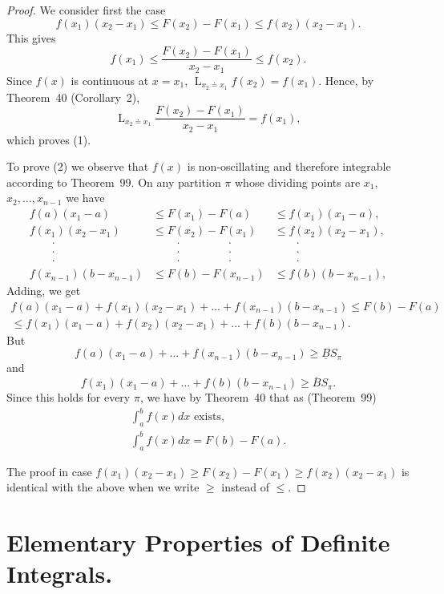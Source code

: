 \documentclass[a4paper,12pt]{book}[2004/02/16]
\providecommand{\leqq}{\leq}
\providecommand{\geqq}{\geq}
\providecommand{\hyperlink}[2]{#2}
\providecommand{\hypertarget}[2]{#2}
\theoremstyle{ilemma}
\theoremstyle{itheorem}
\theoremstyle{iother}
\theoremstyle{icorollary}
\theoremstyle{numcorollary}
\theoremstyle{idefinition}
\begin{document}
\begin{proof}
We consider first the case
\[
  f(x_1)(x_2-x_1) \leqq F(x_2)-F(x_1) \leqq f(x_2)(x_2-x_1).
\]
This gives
\[
  f(x_1) \leqq \frac{F(x_2)-F(x_1)}{x_2-x_1} \leqq f(x_2).
\]
Since $f(x)$ is continuous at $x=x_1$,
$\displaystyle{\mathop{L}_{x_2\doteq x_1}} f(x_2) = f(x_1)$. Hence, by
Theorem~\hyperlink{thm40}{40} (Corollary~\hyperlink{cor2p82}{2}),
\[
  \mathop{L}_{x_2\doteq x_1} \frac{F(x_2)-F(x_1)}{x_2-x_1} = f(x_1),
\]
which proves \hyperlink{concl1}{(1)}.

To prove \hyperlink{concl2}{(2)} we observe that $f(x)$ is non-oscillating and therefore
integrable according to Theorem~\hyperlink{thm99}{99}. On any partition $\pi$ whose
dividing points are $x_1$, $x_2, \ldots, x_{n-1}$ we have
\[
\begin{array}{lll}
 f(a)(x_1-a) & \leqq F(x_1)-F(a) & \leqq f(x_1)(x_1-a),
\\
 f(x_1)(x_2-x_1)
& \leqq F(x_2)-F(x_1)
& \leqq f(x_2)(x_2-x_1),
\\
 \qquad\cdot & \qquad\cdot \qquad\qquad\cdot & \qquad\cdot  \\
 \qquad\cdot & \qquad\cdot \qquad\qquad\cdot & \qquad\cdot  \\
 \qquad\cdot & \qquad\cdot \qquad\qquad\cdot & \qquad\cdot
\\
 f(x_{n-1})(b-x_{n-1})
& \leqq F(b)-F(x_{n-1})
& \leqq f(b)(b-x_{n-1}),
\end{array}
\]
Adding, we get
\begin{gather*}
  f(a)(x_1-a) + f(x_1)(x_2-x_1) + \ldots + f(x_{n-1})(b-x_{n-1})
\leqq F(b)-F(a)
\\
\leqq f(x_1)(x_1-a) + f(x_2)(x_2-x_1) + \ldots + f(b)(b-x_{n-1}).
\end{gather*}
But
\[
  f(a)(x_1-a) +\ldots + f(x_{n-1})(b-x_{n-1}) \geqq \underline{B}S_\pi
\]
and
\[
  f(x_1)(x_1-a) + \ldots + f(b)(b-x_{n-1}) \geqq \overline{B}S_\pi.
\]
Since this holds for every $\pi$, we have by Theorem~\hyperlink{thm40}{40} that as
(Theorem~\hyperlink{thm99}{99})
\begin{gather*}
 \int_a^b f(x) dx \text{ exists,}
\\
 \int_a^b f(x) dx = F(b)-F(a).
\end{gather*}

The proof in case $ f(x_1)(x_2-x_1) \geqq F(x_2)-F(x_1) \geqq
f(x_2)(x_2-x_1)$ is identical with the above when we write $\geqq$
instead of $\leqq$.
\end{proof}
\section{Elementary Properties of Definite Integrals.}\hypertarget{chVIIIsec4}{}%
\end{document}
